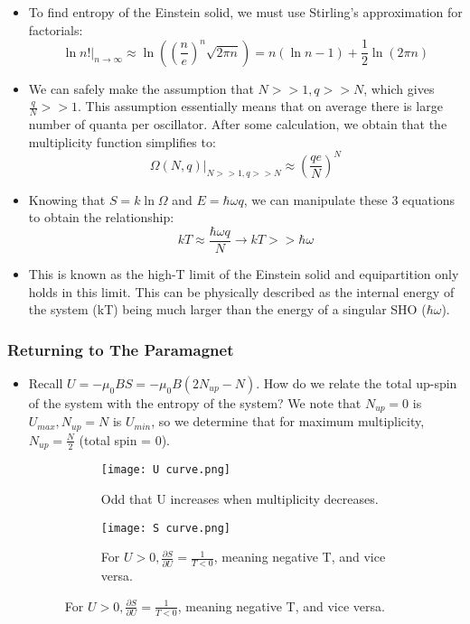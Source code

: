 \documentclass[12pt, letterpaper, twoside]{article}
\begin{document}
\begin{itemize}
    \item To find entropy of the Einstein solid, we must use Stirling's approximation for factorials:
    \begin{equation*}
        \ln{n!}|_{n\rightarrow\infty} \approx \ln{((\frac{n}{e})^n\sqrt{2\pi n})} = n(\ln{n} - 1) + \frac{1}{2}\ln{(2\pi n)}
    \end{equation*} 
    \item We can safely make the assumption that $N >> 1, q>>N$, which gives $\frac{q}{N} >> 1$. This assumption essentially means that on average there is large number of quanta per oscillator. After some calculation, we obtain that the multiplicity function simplifies to:
    \begin{equation*}
        \Omega(N, q)|_{N >> 1, q >>N} \approx (\frac{qe}{N})^N
    \end{equation*}
    \item Knowing that $S = k\ln{\Omega}$ and $E = \hbar\omega q$, we can manipulate these 3 equations to obtain the relationship:
    \begin{equation*}
        kT \approx \frac{\hbar\omega q}{N} \longrightarrow kT >> \hbar\omega
    \end{equation*}
    \item This is known as the high-T limit of the Einstein solid and equipartition only holds in this limit. This can be physically described as the internal energy of the system (kT) being much larger than the energy of a singular SHO ($\hbar\omega$).
\end{itemize}
\subsubsection{Returning to The Paramagnet}

\begin{itemize}
    \item Recall $U = -\mu_0BS = -\mu_0B(2N_{up} - N)$. How do we relate the total up-spin of the system with the entropy of the system? We note that $N_{up} = 0$ is $U_{max}, N_{up} = N$ is $U_{min}$, so we determine that for maximum multiplicity, $N_{up} = \frac{N}{2}$ (total spin = 0).
    \begin{figure}[!ht]
        \centering
        \begin{subfigure}{0.48\textwidth}
            \centering
            \texttt{[image: U curve.png]}
            \caption{Odd that U increases when multiplicity decreases.}
            \label{fig:p1p2}
        \end{subfigure}%
        \hspace{0.2cm}
        \begin{subfigure}{0.48\textwidth}
            \centering
            \texttt{[image: S curve.png]}
            \caption{For $U > 0, \frac{\partial S}{\partial U} = \frac{1}{T < 0}$, meaning negative T, and vice versa.}
            \label{fig:p1p2 2}
        \end{subfigure}    
    \end{figure}
\end{itemize}
\end{document}

